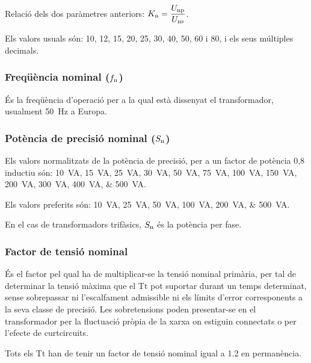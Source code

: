 Relació  dels dos paràmetres anteriors: $K_\mathrm{n} = \dfrac{U_\mathrm{np}}{U_\mathrm{ns}}$.

 Els valors usuals són: 10, 12, 15, 20, 25, 30, 40, 50, 60 i 80, i els seus múltiples decimals.

\subsubsection{Freqüència nominal ($f_\mathrm{n}$)}

 És la freqüència d'operació per a la qual  està dissenyat el transformador, usualment \qty{50}{Hz} a Europa.

\subsubsection{Potència de precisió nominal ($S_\mathrm{n}$)}

Els valors normalitzats de la potència de precisió, per
a un factor de potència 0,8 inductiu són: \qtylist{10; 15; 25; 30; 50; 75; 100; 150;
 200; 300; 400; 500}{VA}.

 Els valors preferits són: \qtylist{10; 25; 50; 100; 200; 500}{VA}.

En el cas de transformadors trifàsics, $S_\mathrm{n}$ és la potència per fase.

\subsubsection{Factor de tensió nominal}

 És el factor pel qual ha de
multiplicar-se la tensió nominal primària, per tal de determinar la
tensió màxima que el Tt pot suportar durant un temps determinat,
sense sobrepassar ni l'escalfament admissible ni els límits d'error
corresponents a la seva classe de precisió. Les sobretensions poden
presentar-se en el transformador  per la fluctuació
pròpia de la xarxa on estiguin connectats o per l'efecte de curtcircuits.

Tots els  Tt han de tenir un factor de tensió nominal igual a \num{1,2} en permanència.


